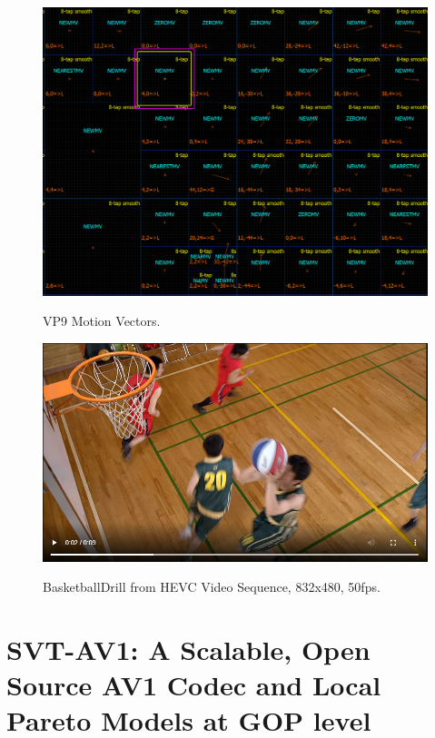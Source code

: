 \documentclass{book}
\begin{document}
\begin{figure}[hbt!]
	\centering
	{\includegraphics[width=\columnwidth]{pictures/ch5/VP9-MVs.png}
		\label{fig:VP9-MVs}}
	\caption{VP9 Motion Vectors.}
\end{figure}



\begin{figure}[h!]
	\centering
	{\includegraphics[width=\columnwidth]{pictures/ch5/BasketballDrill_VP9.png}
		\label{fig:Vp9_BBDrill}}
	\caption{BasketballDrill from HEVC \cite{HEVCTestvideo} Video Sequence, 832x480, 50fps.}
\end{figure}

%
%
\chapter[SVT-AV1: A Scalable, Open Source AV1 Codec and Pareto Models]{SVT-AV1: A Scalable, Open Source AV1 Codec and Local Pareto Models at GOP level}
\end{document}
